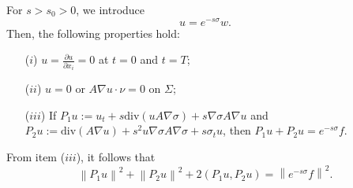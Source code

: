 \documentclass[9pt,reqno]{amsart}
\theoremstyle{plain}
\numberwithin{equation}{section}
\numberwithin{theorem}{section}
\begin{document}
	For $s>s_0>0$, we introduce
	\begin{equation*}
		u=e^{-s\sigma} w.  
	\end{equation*}
	Then, the following properties hold:
	\begin{itemize}
		\item [($i$)] $u=\frac{\partial u}{\partial x_i}=0$ at $t=0$ and $t=T$;
		\item [($ii$)] $u=0$ or $A\nabla u \cdot \nu =0 $ on $\Sigma$;
		\item [($iii$)] If $P_1 u:=u_t+s \mathrm{div}(u A \nabla \sigma)+s \nabla \sigma A \nabla u$ and $P_2 u:=\mathrm{div}(A \nabla u)+s^2 u \nabla \sigma A \nabla \sigma+s \sigma_t u$, then $P_1 u+P_2 u=e^{-s \sigma} f$.
	\end{itemize}
	From item ($iii$), it follows that
	\begin{equation}\label{P}
		\left\|P_1 u\right\|^2+\left\|P_2 u\right\|^2+2\left(P_1 u, P_2 u\right)=\left\|e^{-s \sigma} f\right\|^2.
	\end{equation}
	
\end{document}
